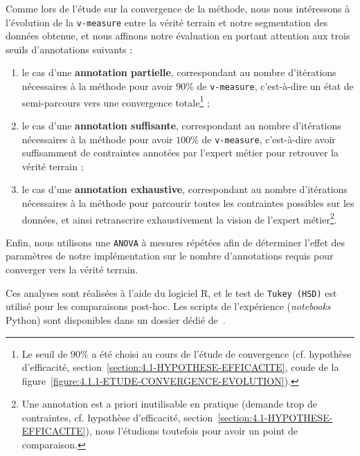 			Comme lors de l'étude sur la convergence de la méthode, nous nous intéressons à l'évolution de la \texttt{v-measure} entre la vérité terrain et notre segmentation des données obtenue, et nous affinons notre évaluation en portant attention aux trois seuils d'annotations suivants :
			\begin{enumerate}
				\item le cas d'une \textbf{annotation partielle}, correspondant au nombre d'itérations nécessaires à la méthode pour avoir $90$\% de \texttt{v-measure}, c'est-à-dire un état de semi-parcours vers une convergence totale\footnote{Le seuil de $90$\% a été choisi au cours de l'étude de convergence (cf. hypothèse d'efficacité, section~\ref{section:4.1-HYPOTHESE-EFFICACITE}, coude de la figure~\ref{figure:4.1.1-ETUDE-CONVERGENCE-EVOLUTION}).} ;
				\item le cas d'une \textbf{annotation suffisante}, correspondant au nombre d'itérations nécessaires à la méthode pour avoir $100$\% de \texttt{v-measure}, c'est-à-dire avoir suffisamment de contraintes annotées par l'expert métier pour retrouver la vérité terrain ;
				\item le cas d'une \textbf{annotation exhaustive}, correspondant au nombre d'itérations nécessaires à la méthode pour parcourir toutes les contraintes possibles sur les données, et ainsi retranscrire exhaustivement la vision de l'expert métier\footnote{Une annotation est a priori inutilisable en pratique (demande trop de contraintes, cf. hypothèse d'efficacité, section~\ref{section:4.1-HYPOTHESE-EFFICACITE}), nous l'étudions toutefois pour avoir un point de comparaison.}.
			\end{enumerate}
			
			Enfin, nous utilisons une \texttt{ANOVA} à mesures répétées afin de déterminer l’effet des paramètres de notre implémentation sur le nombre d’annotations requis pour converger vers la vérité terrain.
			
			\begin{leftBarInformation}
				Ces analyses sont réalisées à l'aide du logiciel R, et le test de \texttt{Tukey (HSD)} est utilisé pour les comparaisons post-hoc.
				Les scripts de l'expérience (\textit{notebooks} Python) sont disponibles dans un dossier dédié de~\cite{schild:cognitivefactory-interactive-clustering-comparative-study:2021}.
			\end{leftBarInformation}

